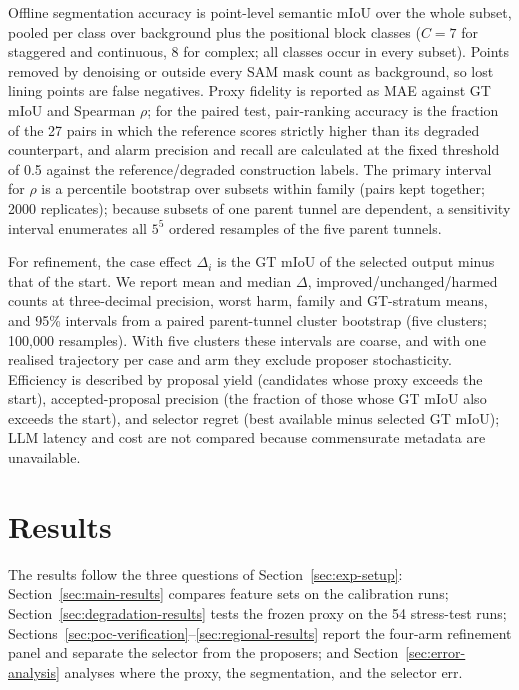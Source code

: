 \documentclass[a4paper,fleqn]{cas-dc}
\begin{document}
Offline segmentation accuracy is point-level semantic mIoU over the whole subset, pooled per class over background plus the positional block classes ($C=7$ for staggered and continuous, $8$ for complex; all classes occur in every subset). Points removed by denoising or outside every SAM mask count as background, so lost lining points are false negatives. Proxy fidelity is reported as MAE against GT mIoU and Spearman $\rho$; for the paired test, pair-ranking accuracy is the fraction of the 27 pairs in which the reference scores strictly higher than its degraded counterpart, and alarm precision and recall are calculated at the fixed threshold of 0.5 against the reference/degraded construction labels. The primary interval for $\rho$ is a percentile bootstrap over subsets within family (pairs kept together; 2000 replicates); because subsets of one parent tunnel are dependent, a sensitivity interval enumerates all $5^5$ ordered resamples of the five parent tunnels.

For refinement, the case effect $\Delta_i$ is the GT mIoU of the selected output minus that of the start. We report mean and median $\Delta$, improved/unchanged/harmed counts at three-decimal precision, worst harm, family and GT-stratum means, and 95\% intervals from a paired parent-tunnel cluster bootstrap (five clusters; 100{,}000 resamples). With five clusters these intervals are coarse, and with one realised trajectory per case and arm they exclude proposer stochasticity. Efficiency is described by proposal yield (candidates whose proxy exceeds the start), accepted-proposal precision (the fraction of those whose GT mIoU also exceeds the start), and selector regret (best available minus selected GT mIoU); LLM latency and cost are not compared because commensurate metadata are unavailable.

\section{Results}\label{sec:results}

The results follow the three questions of Section~\ref{sec:exp-setup}: Section~\ref{sec:main-results} compares feature sets on the calibration runs; Section~\ref{sec:degradation-results} tests the frozen proxy on the 54 stress-test runs; Sections~\ref{sec:poc-verification}--\ref{sec:regional-results} report the four-arm refinement panel and separate the selector from the proposers; and Section~\ref{sec:error-analysis} analyses where the proxy, the segmentation, and the selector err.
\end{document}
